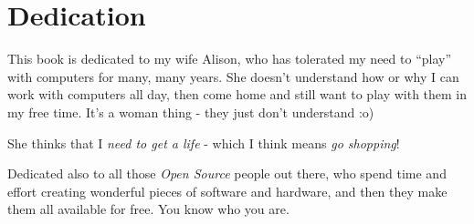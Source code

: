 \section*{Dedication}\label{dedication}

This book is dedicated to my wife Alison, who has tolerated my need to ``play'' with computers for many, many years. She doesn't understand how or why I can work with computers all day, then come home and still want to play with them in my free time. It's a woman thing - they just don't understand :o)

She thinks that I \emph{need to get a life} - which I think means
\emph{go shopping}!

Dedicated also to all those \emph{Open Source} people out there, who spend time and effort creating wonderful pieces of software and hardware, and then they make them all available for free. You know who you are.
